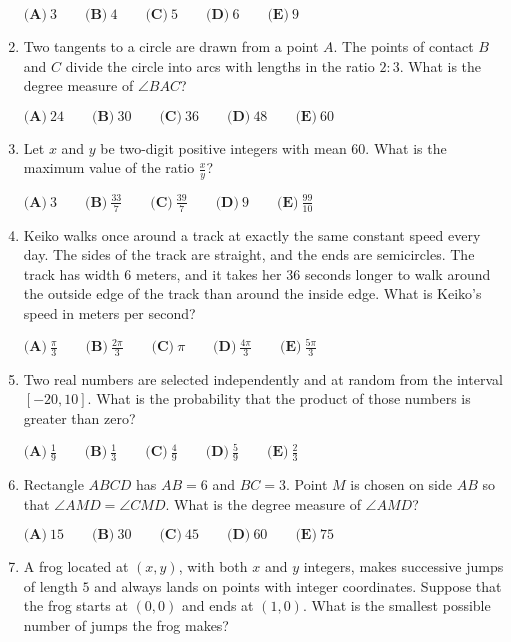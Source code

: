 \documentclass{article}
\begin{document}
\begin{enumerate}[label=\arabic*., itemsep=0.5em]
$\textbf{(A)}\ 3 \qquad \textbf{(B)}\ 4 \qquad \textbf{(C)}\ 5 \qquad \textbf{(D)}\ 6 \qquad \textbf{(E)}\ 9$\par \vspace{0.5em}\item Two tangents to a circle are drawn from a point $A$.  The points of contact $B$ and $C$ divide the circle into arcs with lengths in the ratio $2 : 3$.  What is the degree measure of $\angle{BAC}$?

$\textbf{(A)}\ 24 \qquad \textbf{(B)}\ 30 \qquad \textbf{(C)}\ 36 \qquad \textbf{(D)}\ 48 \qquad \textbf{(E)}\ 60$\par \vspace{0.5em}\item Let $x$ and $y$ be two-digit positive integers with mean $60$.  What is the maximum value of the ratio $\frac{x}{y}$?

$\textbf{(A)}\ 3 \qquad \textbf{(B)}\ \frac{33}{7} \qquad \textbf{(C)}\ \frac{39}{7} \qquad \textbf{(D)}\ 9 \qquad \textbf{(E)}\ \frac{99}{10}$\par \vspace{0.5em}\item Keiko walks once around a track at exactly the same constant speed every day. The sides of the track are straight, and the ends are semicircles. The track has width $6$ meters, and it takes her $36$ seconds longer to walk around the outside edge of the track than around the inside edge. What is Keiko's speed in meters per second?

$\textbf{(A)}\ \frac{\pi}{3} \qquad \textbf{(B)}\ \frac{2\pi}{3} \qquad \textbf{(C)}\ \pi \qquad \textbf{(D)}\ \frac{4\pi}{3} \qquad \textbf{(E)}\ \frac{5\pi}{3}$\par \vspace{0.5em}\item Two real numbers are selected independently and at random from the interval $[-20,10]$.  What is the probability that the product of those numbers is greater than zero?

$\textbf{(A)}\ \frac{1}{9} \qquad \textbf{(B)}\ \frac{1}{3} \qquad \textbf{(C)}\ \frac{4}{9} \qquad \textbf{(D)}\ \frac{5}{9} \qquad \textbf{(E)}\ \frac{2}{3}$\par \vspace{0.5em}\item Rectangle $ABCD$ has $AB=6$ and $BC=3$. Point $M$ is chosen on side $AB$ so that $\angle AMD=\angle CMD$. What is the degree measure of $\angle AMD$?

$\textbf{(A)}\ 15 \qquad \textbf{(B)}\ 30 \qquad \textbf{(C)}\ 45 \qquad \textbf{(D)}\ 60 \qquad \textbf{(E)}\ 75$\par \vspace{0.5em}\item A frog located at $(x,y)$, with both $x$ and $y$ integers, makes successive jumps of length $5$ and always lands on points with integer coordinates. Suppose that the frog starts at $(0,0)$ and ends at $(1,0)$. What is the smallest possible number of jumps the frog makes?


\end{enumerate}
\end{document}
